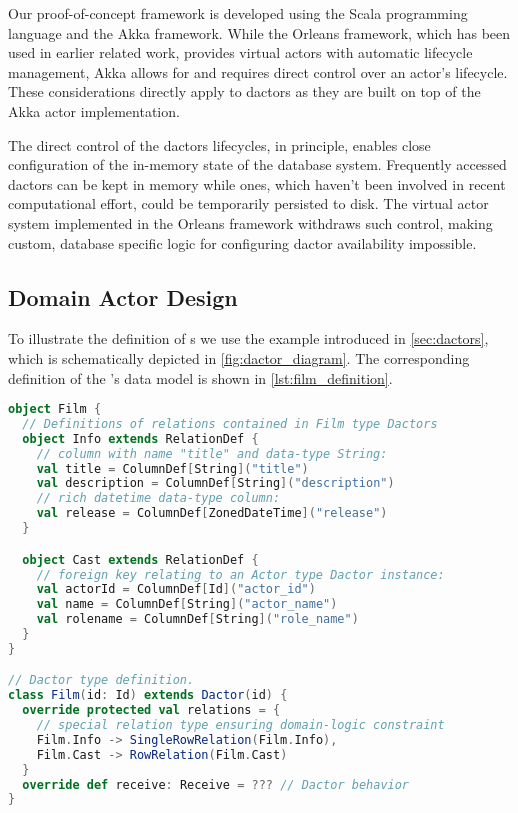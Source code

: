 Our proof-of-concept framework is developed using the Scala programming language and the Akka framework.
While the Orleans framework, which has been used in earlier related work, provides virtual actors with automatic lifecycle management, Akka allows for and requires direct control over an actor's lifecycle.
These considerations directly apply to \glspl{dactor} as they are built on top of the Akka actor implementation.

The direct control of the \glspl{dactor} lifecycles, in principle, enables close configuration of the in-memory state of the database system.
Frequently accessed \glspl{dactor} can be kept in memory while ones, which haven't been involved in recent computational effort, could be temporarily persisted to disk.
The virtual actor system implemented in the Orleans framework withdraws such control, making custom, database specific logic for configuring \gls{dactor} availability impossible.

\subsection{Domain Actor Design}\label{subsec:domain_actor_design}

To illustrate the definition of s we use the example introduced in \cref{sec:dactors}, which is schematically depicted in \cref{fig:dactor_diagram}.
The corresponding definition of the 's data model is shown in \cref{lst:film_definition}.
\begin{lstlisting}[float, caption={Film Dactor type definition using the presented framework.}, label={lst:film_definition}, language=Scala]
object Film {
  // Definitions of relations contained in Film type Dactors
  object Info extends RelationDef {
    // column with name "title" and data-type String:
    val title = ColumnDef[String]("title")
    val description = ColumnDef[String]("description")
    // rich datetime data-type column:
    val release = ColumnDef[ZonedDateTime]("release")
  }

  object Cast extends RelationDef {
    // foreign key relating to an Actor type Dactor instance:
    val actorId = ColumnDef[Id]("actor_id")
    val name = ColumnDef[String]("actor_name")
    val rolename = ColumnDef[String]("role_name")
  }
} 

// Dactor type definition.
class Film(id: Id) extends Dactor(id) {
  override protected val relations = {
    // special relation type ensuring domain-logic constraint
    Film.Info -> SingleRowRelation(Film.Info),
    Film.Cast -> RowRelation(Film.Cast)
  }
  override def receive: Receive = ??? // Dactor behavior
}
\end{lstlisting}

